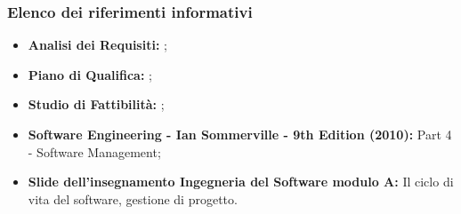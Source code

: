 		\subsubsection{Elenco dei riferimenti informativi}
			\begin{itemize}
				\item \textbf{Analisi dei Requisiti:} ;
				\item \textbf{Piano di Qualifica:} ;
				\item \textbf{Studio di Fattibilità:} ;
				\item \textbf{Software Engineering - Ian Sommerville - 9th Edition (2010):} Part 4 - Software Management;
				\item \textbf{Slide dell’insegnamento Ingegneria del Software modulo A:} Il ciclo di vita del software, gestione di progetto.
			\end{itemize}